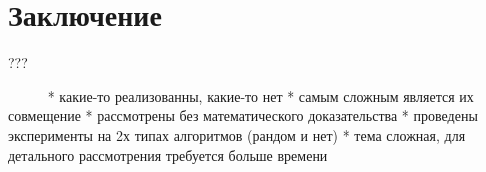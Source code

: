 \section{Заключение}

???

~~~~~
* какие-то реализованны, какие-то нет
* самым сложным является их совмещение
* рассмотрены без математического доказательства
* проведены эксперименты на 2х типах алгоритмов (рандом и нет)
* тема сложная, для детального рассмотрения требуется больше
  времени
